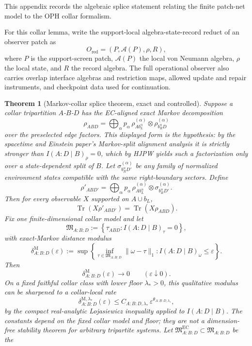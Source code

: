 \documentclass[11pt]{article}
\newtheorem{theorem}{Theorem}[section]
\theoremstyle{remark}
\theoremstyle{plain}
\begin{document}
This appendix records the algebraic splice statement relating the finite patch-net model to
the OPH collar formalism.

For this collar lemma, write the support-local algebra-state-record reduct of an observer patch as
\[
O_{\mathrm{red}}=(P,\mathcal{A}(P),\rho,R),
\]
where $P$ is the support-screen patch, $\mathcal{A}(P)$ the local von Neumann algebra, $\rho$ the
local state, and $R$ the record algebra. The full operational observer also carries overlap
interface algebras and restriction maps, allowed update and repair instruments, and checkpoint data
used for continuation.

\begin{theorem}[Markov-collar splice theorem, exact and controlled]\label{thm:splice}
Suppose a collar tripartition $A$-$B$-$D$ has the EC-aligned exact Markov decomposition
\[
\rho_{ABD}
=
\bigoplus_{\alpha}
p_\alpha\,
\rho^{(\alpha)}_{A b_L^\alpha}
\otimes
\rho^{(\alpha)}_{b_R^\alpha D}
\]
over the preselected edge factors. This displayed form is the hypothesis: by the spacetime and Einstein paper's Markov-split alignment analysis it is strictly stronger than \(I(A:D\mid B)_\rho=0\), which by HJPW yields such a factorization only over a state-dependent split of \(B\).
Let $\sigma_{b_R^\alpha D'}^{(\alpha)}$ be any family of normalized environment states compatible with the same right-boundary sectors. Define
\[
\rho'_{AB D'}
=
\bigoplus_{\alpha}
p_\alpha\,
\rho^{(\alpha)}_{A b_L^\alpha}
\otimes
\sigma_{b_R^\alpha D'}^{(\alpha)}.
\]
Then for every observable $X$ supported on $A\cup b_L$,
\[
\operatorname{Tr}(X\rho'_{AB D'})
=
\operatorname{Tr}(X\rho_{ABD}).
\]
Fix one finite-dimensional collar model and let
\[
\mathfrak M_{A:B:D}
:=
\left\{
\tau_{ABD}: I(A:D\mid B)_\tau=0
\right\},
\]
with exact-Markov distance modulus
\[
\delta^{\mathrm M}_{A:B:D}(\varepsilon)
:=
\sup\left\{
\inf_{\tau\in\mathfrak M_{A:B:D}}\|\omega-\tau\|_1:
I(A:D\mid B)_\omega\le\varepsilon
\right\}.
\]
Then
\[
\delta^{\mathrm M}_{A:B:D}(\varepsilon)\to0
\qquad
(\varepsilon\downarrow0).
\]
On a fixed faithful collar class with lower floor \(\lambda_\ast>0\), this
qualitative modulus can be sharpened to a collar-local rate
\[
\delta^{\mathrm M,\lambda_\ast}_{A:B:D}(\varepsilon)
\le
C_{A:B:D,\lambda_\ast}\,\varepsilon^{\theta_{A:B:D,\lambda_\ast}},
\]
by the compact real-analytic Lojasiewicz inequality applied to
\(I(A:D\mid B)\). The constants depend on the fixed collar model and floor;
they are not a dimension-free stability theorem for arbitrary tripartite
systems.
Let \(\mathfrak M^{\mathrm{EC}}_{A:B:D}\subset\mathfrak M_{A:B:D}\) be the

\end{theorem}
\end{document}
